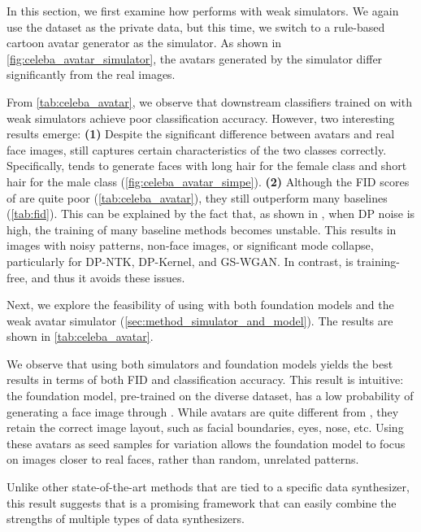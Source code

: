 In this section, we first examine how \simpe{} performs with weak simulators. We again use the \celeba{} dataset as the private data, but this time, we switch to a rule-based cartoon avatar generator \cite{pythonavatar} as the simulator. As shown in \cref{fig:celeba_avatar_simulator}, the avatars generated by the simulator differ significantly from the real \celeba{} images.

 From \cref{tab:celeba_avatar}, we observe that downstream classifiers trained on \simpe{} with weak simulators achieve poor classification accuracy. However, two interesting results emerge: \textbf{(1)} Despite the significant difference between avatars and real face images, \simpe{} still captures certain characteristics of the two classes correctly. Specifically, \simpe{} tends to generate faces with long hair for the female class and short hair for the male class (\cref{fig:celeba_avatar_simpe}). \textbf{(2)} Although the FID scores of \simpe{} are quite poor (\cref{tab:celeba_avatar}), they still outperform many baselines (\cref{tab:fid}). This can be explained by the fact that, as shown in \citet{dpimagebench}, when DP noise is high, the training of many baseline methods becomes unstable. %
This results in images with noisy patterns, non-face images, or significant mode collapse, particularly for DP-NTK, DP-Kernel, and GS-WGAN. In contrast, \simpe{} is training-free, and thus it avoids these issues.

Next, we explore the feasibility of using \pe{} with both foundation models and the weak avatar simulator (\cref{sec:method_simulator_and_model}). The results are shown in \cref{tab:celeba_avatar}.

 We observe that using both simulators and foundation models yields the best results in terms of both FID and classification accuracy. This result is intuitive: the foundation model, pre-trained on the diverse \imagenet{} dataset, has a low probability of generating a face image through \randomsampleapiname{}. While avatars are quite different from \celeba{}, they retain the correct image layout, such as facial boundaries, eyes, nose, etc. Using these avatars as seed samples for variation allows the foundation model to focus on images closer to real faces, rather than random, unrelated patterns.

Unlike other state-of-the-art methods that are tied to a specific data synthesizer, this result suggests that \pe{} is a promising framework that can easily combine the strengths of multiple types of data synthesizers.

